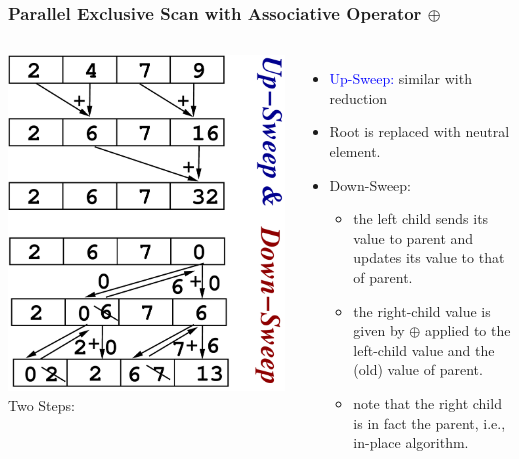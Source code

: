 \documentclass{beamer}
\newcommand{\blue}[1]{\textcolor{Blue}{{#1}}}
\newcommand{\emp}[1]{\textcolor{DikuRed}{ #1}}
\begin{document}
\begin{frame}[fragile,t]
  \frametitle{Parallel Exclusive Scan with Associative Operator $\oplus$}
\bigskip

\begin{columns}
        \includegraphics[height=33ex]{Figures/ScanEg.pdf} 
Two Steps:
\begin{itemize}
    \item \blue{Up-Sweep:} similar with reduction
    \item Root is replaced with neutral element.
    \item \emp{Down-Sweep:} 
    \begin{itemize}
        \item the left child sends its value to parent and 
                updates its value to that of parent.
        \item the right-child value is given by $\oplus$ 
                applied to the left-child value and
                the (old) value of parent.
        \item note that the right child is in fact the parent,
                i.e., in-place algorithm.
    \end  {itemize}
\end  {itemize}
\end{columns}


\end{frame}
\end{document}
